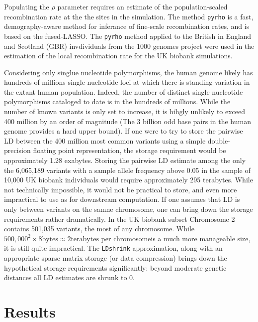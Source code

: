 Populating the \(\rho\) parameter requires an estimate of the population-scaled recombination rate at the the sites in the simulation.  The method \texttt{pyrho} is a fast, demography-aware method for inferance of fine-scale recombination rates, and is based on
the fused-LASSO\cite{Spence_2019}. The \texttt{pyrho} method applied to the British in England and Scotland (GBR) invdividuals from the 1000 genomes project\cite{1kg} were used in the estimation of the local recombination rate for the UK biobank simulations.


Considering only singlue nucleotide polymorphisms, the human genome likely has hundreds of millions single nucleotide loci at which there is standing variation in the extant human population\cite{humgenref}.  Indeed, the
number of distinct single nucleotide polymorphisms cataloged to date is in the hundreds of millions\cite{humgenref}.  While the number of known variants is only set to increase, it is hihgly unlikely to exceed 400 million by an order
of magnitude (The 3 billion odd base pairs in the human genome provides a hard upper bound).  If one were to try to store the pairwise LD between the 400 million most common variants using a simple double-precision floating point
representation, the storage requirement would be approximately 1.28 exabytes.  Storing the pairwise LD estimate among the only the 6,065,189 variants with a sample allele frequency above 0.05 in the sample of 10,000 UK biobank
individuals would require approximately 295 terabytes.  While not technically impossible, it would not be practical to store, and even more impractical to use as for downstream computation.  If one assumes that LD is only between
variants on the samne chromosome, one can bring down the storage requirements rather dramatically.  In the UK biobank subset Chromosome 2 contains 501,035 variants, the most of any chromosome.  While
$500,000^2 \times 8 \text{bytes} \approx 2\text{terabytes}$ per chromosomeis a much more manageable size, it is still quite impractical.  The \texttt{LDshrink} approximation, along with an appropriate sparse matrix storage (or data
compression) brings down the hypothetical storage requirements significantly: beyond moderate genetic distances all LD estimates are shrunk to 0.  

\section{Results}\label{sec:org26555b8}

